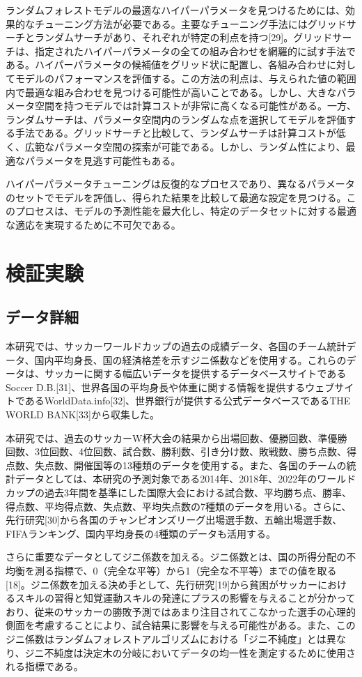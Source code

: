 \documentclass[platex]{suribt}
\begin{document}
ランダムフォレストモデルの最適なハイパーパラメータを見つけるためには、効果的なチューニング方法が必要である。主要なチューニング手法にはグリッドサーチとランダムサーチがあり、それぞれが特定の利点を持つ[29]。グリッドサーチは、指定されたハイパーパラメータの全ての組み合わせを網羅的に試す手法である。ハイパーパラメータの候補値をグリッド状に配置し、各組み合わせに対してモデルのパフォーマンスを評価する。この方法の利点は、与えられた値の範囲内で最適な組み合わせを見つける可能性が高いことである。しかし、大きなパラメータ空間を持つモデルでは計算コストが非常に高くなる可能性がある。一方、ランダムサーチは、パラメータ空間内のランダムな点を選択してモデルを評価する手法である。グリッドサーチと比較して、ランダムサーチは計算コストが低く、広範なパラメータ空間の探索が可能である。しかし、ランダム性により、最適なパラメータを見逃す可能性もある。

ハイパーパラメータチューニングは反復的なプロセスであり、異なるパラメータのセットでモデルを評価し、得られた結果を比較して最適な設定を見つける。このプロセスは、モデルの予測性能を最大化し、特定のデータセットに対する最適な適応を実現するために不可欠である。


\chapter{検証実験}
\section{データ詳細}
本研究では、サッカーワールドカップの過去の成績データ、各国のチーム統計データ、国内平均身長、国の経済格差を示すジニ係数などを使用する。これらのデータは、サッカーに関する幅広いデータを提供するデータベースサイトであるSoccer D.B.[31]、世界各国の平均身長や体重に関する情報を提供するウェブサイトであるWorldData.info[32]、世界銀行が提供する公式データベースであるTHE WORLD BANK[33]から収集した。

本研究では、過去のサッカーW杯大会の結果から出場回数、優勝回数、準優勝回数、3位回数、4位回数、試合数、勝利数、引き分け数、敗戦数、勝ち点数、得点数、失点数、開催国等の13種類のデータを使用する。また、各国のチームの統計データとしては、本研究の予測対象である2014年、2018年、2022年のワールドカップの過去3年間を基準にした国際大会における試合数、平均勝ち点、勝率、得点数、平均得点数、失点数、平均失点数の7種類のデータを用いる。さらに、先行研究[30]から各国のチャンピオンズリーグ出場選手数、五輪出場選手数、FIFAランキング、国内平均身長の4種類のデータも活用する。

さらに重要なデータとしてジニ係数を加える。ジニ係数とは、国の所得分配の不均衡を測る指標で、0（完全な平等）から1（完全な不平等）までの値を取る[18]。ジニ係数を加える決め手として、先行研究[19]から貧困がサッカーにおけるスキルの習得と知覚運動スキルの発達にプラスの影響を与えることが分かっており、従来のサッカーの勝敗予測ではあまり注目されてこなかった選手の心理的側面を考慮することにより、試合結果に影響を与える可能性がある。また、このジニ係数はランダムフォレストアルゴリズムにおける「ジニ不純度」とは異なり、ジニ不純度は決定木の分岐においてデータの均一性を測定するために使用される指標である。
\end{document}
